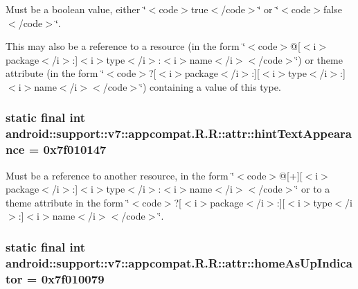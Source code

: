Must be a boolean value, either \char`\"{}$<$code$>$true$<$/code$>$\char`\"{} or \char`\"{}$<$code$>$false$<$/code$>$\char`\"{}. 

This may also be a reference to a resource (in the form \char`\"{}$<$code$>$@\mbox{[}$<$i$>$package$<$/i$>$:\mbox{]}$<$i$>$type$<$/i$>$:$<$i$>$name$<$/i$>$$<$/code$>$\char`\"{}) or theme attribute (in the form \char`\"{}$<$code$>$?\mbox{[}$<$i$>$package$<$/i$>$:\mbox{]}\mbox{[}$<$i$>$type$<$/i$>$:\mbox{]}$<$i$>$name$<$/i$>$$<$/code$>$\char`\"{}) containing a value of this type. \hypertarget{classandroid_1_1support_1_1v7_1_1appcompat_1_1_r_1_1attr_360493ea095131a07aba3429cd028a9d}{
\subsubsection[{hintTextAppearance}]{\setlength{\rightskip}{0pt plus 5cm}static final int android::support::v7::appcompat.R.R::attr::hintTextAppearance = 0x7f010147}}
\label{classandroid_1_1support_1_1v7_1_1appcompat_1_1_r_1_1attr_360493ea095131a07aba3429cd028a9d}


Must be a reference to another resource, in the form \char`\"{}$<$code$>$@\mbox{[}+\mbox{]}\mbox{[}$<$i$>$package$<$/i$>$:\mbox{]}$<$i$>$type$<$/i$>$:$<$i$>$name$<$/i$>$$<$/code$>$\char`\"{} or to a theme attribute in the form \char`\"{}$<$code$>$?\mbox{[}$<$i$>$package$<$/i$>$:\mbox{]}\mbox{[}$<$i$>$type$<$/i$>$:\mbox{]}$<$i$>$name$<$/i$>$$<$/code$>$\char`\"{}. \hypertarget{classandroid_1_1support_1_1v7_1_1appcompat_1_1_r_1_1attr_d4f9f893a5bbc87b81c7dd46742d2bd6}{
\subsubsection[{homeAsUpIndicator}]{\setlength{\rightskip}{0pt plus 5cm}static final int android::support::v7::appcompat.R.R::attr::homeAsUpIndicator = 0x7f010079}}
\label{classandroid_1_1support_1_1v7_1_1appcompat_1_1_r_1_1attr_d4f9f893a5bbc87b81c7dd46742d2bd6}


